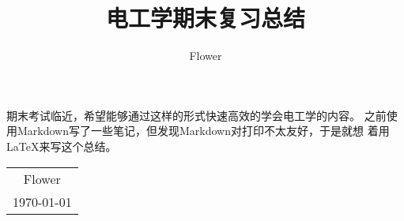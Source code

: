 \documentclass[12pt, a4paper, oneside]{ctexart}%
\date{}
\title{电工学期末复习总结}
\author{Flower}
\begin{document}
\maketitle

期末考试临近，希望能够通过这样的形式快速高效的学会电工学的内容。
之前使用Markdown写了一些笔记，但发现Markdown对打印不太友好，于是就想
着用\LaTeX{}来写这个总结。
~\\
\begin{flushright}
    \begin{tabular}{c}
        Flower\\
        \today
    \end{tabular}
\end{flushright}

\newpage
\tableofcontents
\newpage




\newpage
\end{document}

